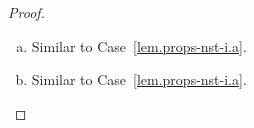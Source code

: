 \begin{proof}
\begin{enumerate}[(a)]
  \item Similar to Case~\eqref{lem.props-nst-i.a}.

  \item Similar to Case~\eqref{lem.props-nst-i.a}.


\end{enumerate}
\end{proof}
